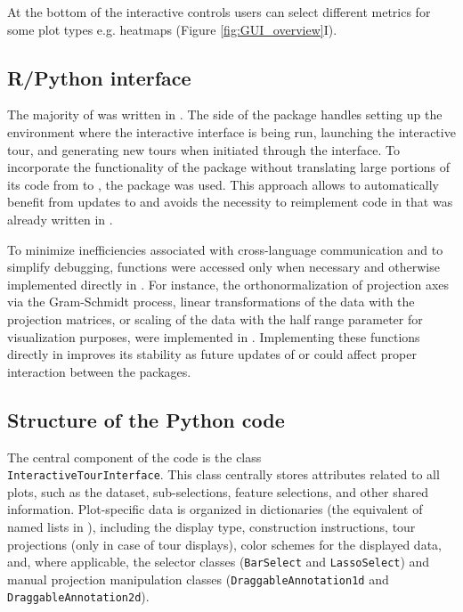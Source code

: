 \documentclass[article]{ajs}
\begin{document}
At the bottom of the interactive controls users can select different metrics for some plot types e.g. heatmaps (Figure \ref{fig:GUI_overview}I).


\subsection{R/Python interface}
The majority of  was written in  \citep{python}. The  \citep{R} side of the package handles setting up the  environment where the interactive interface is being run, launching the interactive tour, and generating new tours when initiated through the interface. To incorporate the functionality of the  package without translating large portions of its code from  to , the  package was used. This approach allows  to automatically benefit from updates to  and avoids the necessity to reimplement code in  that was already written in .

To minimize inefficiencies associated with cross-language communication and to simplify debugging,  functions were accessed only when necessary and otherwise implemented directly in . For instance, the orthonormalization of projection axes via the Gram-Schmidt process, linear transformations of the data with the projection matrices, or scaling of the data with the half range parameter for visualization purposes, were implemented in . Implementing these functions directly in  improves its stability as future updates of  or  could affect proper interaction between the packages.


\subsection{Structure of the Python code}
The central component of the  code is the  class \\ \texttt{InteractiveTourInterface}. This class centrally stores attributes related to all plots, such as the dataset, sub-selections, feature selections, and other shared information. Plot-specific data is organized in dictionaries (the  equivalent of named lists in ), including the display type, construction instructions, tour projections (only in case of tour displays), color schemes for the displayed data, and, where applicable, the selector classes (\texttt{BarSelect} and \texttt{LassoSelect}) and manual projection manipulation classes (\texttt{DraggableAnnotation1d} and \texttt{DraggableAnnotation2d}).
\end{document}
